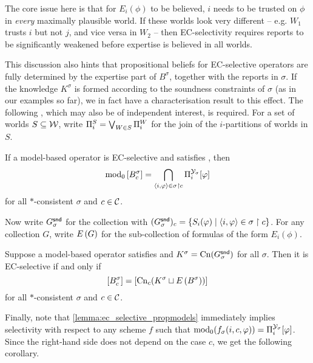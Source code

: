 The core issue here is that for $E_i(\phi)$ to be believed, $i$ needs to be
trusted on $\phi$ in \emph{every} maximally plausible world. If these worlds
look very different -- e.g. $W_1$ trusts $i$ but not $j$, and vice versa in
$W_2$ --  then EC-selectivity requires reports to be significantly weakened
before expertise is believed in all worlds.

This discussion also hints that propositional beliefs for EC-selective
operators are fully determined by the expertise part of $B^\sigma$, together
with the reports in $\sigma$. If the knowledge $K^\sigma$ is formed according
to the soundness constraints of $\sigma$ (as in our examples so far), we in
fact have a characterisation result to this effect. The following
, which may also be of independent
interest, is required. For a set of worlds $S \subseteq \mathcal{W}$, write $\Pi^S_i =
\bigvee_{W \in S}{\Pi^W_i}$ for the join of the $i$-partitions of worlds in
$S$.

\begin{lemma}
    \label{lemma:ec_selective_propmodels}
    If a model-based operator is EC-selective and satisfies \soundness{}, then
    \[
        \operatorname{mod}_0\left[{B^\sigma_c}\right]
        =
        \bigcap_{\langle {i, \varphi} \rangle \in \sigma \upharpoonright c}{
            \Pi^{\mathcal{Y}_\sigma}_i[\varphi]
        }
    \]
    for all $\ast$-consistent $\sigma$ and $c \in \mathcal{C}$.
\end{lemma}

Now write $G^{\mathsf{snd}}_\sigma$ for the collection with $(G^{\mathsf{snd}}_\sigma)_c =
\{S_i(\varphi) \mid \langle {i, \varphi} \rangle \in \sigma \upharpoonright c\}$. For any collection $G$,
write $E\left({G}\right)$ for the sub-collection of formulas of the form $E_i(\phi)$.

\begin{theorem}
    \label{thm:ec_selectivity_characterisation}
    Suppose a model-based operator satisfies \consistency{} and $K^\sigma =
    \operatorname{Cn}(G^{\mathsf{snd}}_\sigma)$ for all $\sigma$. Then it is EC-selective if and only
    if
    \[
        \left[{B^\sigma_c}\right]
        =
        \left[{\operatorname{Cn}_c(K^\sigma \sqcup E\left({B^\sigma}\right))}\right]
    \]
    for all $\ast$-consistent $\sigma$ and $c \in \mathcal{C}$.
\end{theorem}


Finally, note that \cref{lemma:ec_selective_propmodels} immediately implies
selectivity with respect to any scheme $f$ such that $\operatorname{mod}_0(f_\sigma(i, c,
\varphi)) = \Pi^{\mathcal{Y}_\sigma}_i[\varphi]$. Since the right-hand side does not depend on
the case $c$, we get the following corollary.

